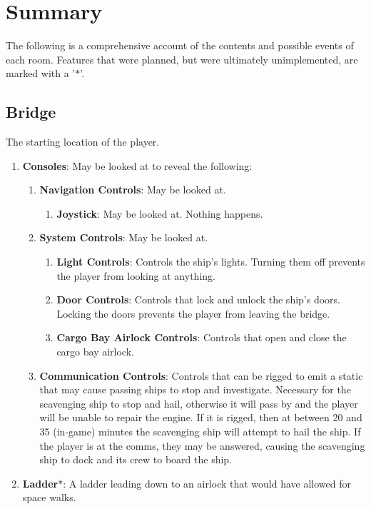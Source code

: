 \documentclass[12pt]{article}
\begin{document}
\section{Summary}

\qq The following is a comprehensive account of the contents and possible events
of each room. Features that were planned, but were ultimately unimplemented, are
marked with a '$\ast$'.


\subsection{Bridge}

\qq The starting location of the player.

\begin{enumerate}
  \item \textbf{Consoles}: May be looked at to reveal the following:
  \begin{enumerate}
    \item \textbf{Navigation Controls}: May be looked at.
    \begin{enumerate}
      \item \textbf{Joystick}: May be looked at. Nothing happens.
    \end{enumerate}
    \item \textbf{System Controls}: May be looked at.
    \begin{enumerate}
      \item \textbf{Light Controls}: Controls the ship's lights. Turning them
        off prevents the player from looking at anything.
      \item \textbf{Door Controls}: Controls that lock and unlock the ship's
        doors. Locking the doors prevents the player from leaving the bridge.
      \item \textbf{Cargo Bay Airlock Controls}: Controls that open and close
        the cargo bay airlock.
    \end{enumerate}
  \item \textbf{Communication Controls}: Controls that can be rigged to emit a
    static that may cause
    passing ships to stop and investigate. Necessary for the scavenging ship to stop
    and hail, otherwise
    it will pass by and the player will be unable to repair the engine. If it is
    rigged, then at between 20 
    and 35 (in-game) minutes the scavenging ship will attempt to hail the ship. If
    the player is at the comms, they may be answered, causing the scavenging ship
    to dock and its crew to board the ship. 
  \end{enumerate}
  \item \textbf{Ladder}$\ast$: A ladder leading down to an airlock that would have
    allowed for space walks.
\end{enumerate}
\end{document}
